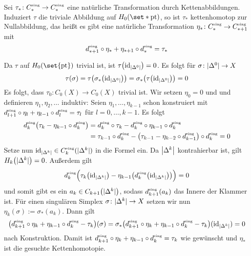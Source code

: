 \begin{proposition}[label=prop:H0_kettenhomotop,{name=[Nullkettenhomotopie von natürlichen Transformationen]}]
	Sei $\tau_* \colon C_*^\sing \to C_*^\sing$ eine natürliche Transformation durch Kettenabbildungen. Induziert $\tau$ die triviale Abbildung auf $H_0(\set*{\pt})$, so ist 
	$\tau_*$ kettenhomotop zur Nullabbildung, das heißt es gibt eine natürliche Transformation $\eta_* \colon C_*^\sing \to C_{*+1}^\sing$ mit 
	\[
		d^\sing_{*+1} \circ \eta_* + \eta_{*+1} \circ d_*^\sing = \tau_* 
	\]
\end{proposition}
\begin{beweis}
	Da $\tau$ auf $H_0(\set{\pt})$ trivial ist, ist $\tau \enbrace*{\id_{\abs*{\Delta^0}}}=0$. Es folgt für $\sigma \colon \abs{\Delta^0} \to X$
	\[
		\tau(\sigma) = \tau \enbrace*{\sigma_* \enbrace*{\id_{\abs*{\Delta^0}}}} = \sigma_* \enbrace*{\tau \enbrace*{\id_{\abs*{\Delta^0}}}} = 0
	\]
	Es folgt, dass $\tau_0 \colon C_0(X) \to C_0(X)$ trivial ist. Wir setzen $\eta_0 = 0$ und und definieren $\eta_1, \eta_2, \ldots $ induktiv: Seien $\eta_1, \ldots,\eta_{k-1}$
	schon konstruiert mit $d^\sing_{l+1} \circ \eta_l + \eta_{l-1} \circ d^\sing_{l}=\tau_l$ für $l=0, \ldots , k-1$. Es folgt
	\begin{align}
		d_k^\sing \enbrace*{\tau_k -  \eta_{k-1} \circ d_k^\sing } &= d^\sing_k \circ \tau_k - d^\sing_k \circ \eta_{k-1} \circ d^\sing_k \\
		&= \tau_{k-1} \circ d_k^\sing -  \enbrace*{\tau_{k-1} - \eta_{k-2} \circ d_{k-1}^\sing} \circ d_k^\sing =0
	\end{align}
	Setze nun $\id_{\abs*{\Delta^k}} \in C_k^\sing( \abs{\Delta^k})$ in die Formel ein. 
	Da $\abs*{\Delta^k}$ kontrahierbar ist, gilt $H_k \enbrace*{\abs{\Delta^k}} =0$. Außerdem gilt
	\[
		d_k^\sing \enbrace[\Big]{\tau_k \enbrace*{\id_{\abs*{\Delta^k} }} - \eta_{k-1} \enbrace*{d_k^\sing \enbrace*{\id_{\abs*{\Delta^k} }}}} =0
	\]
	und somit gibt es ein $a_k \in C_{k+1} \enbrace*{\abs{\Delta^k} }$, sodass $d_{k+1}^\sing(a_k)$ das Innere der Klammer ist. 
	Für einen singulären Simplex $\sigma \colon \abs{\Delta^k} \to X$ setzen wir nun $\eta_k(\sigma) := \sigma_*(a_k)$.
	Dann gilt 
	\[
		\enbrace*{d_{k+1}^\sing \circ \eta_k + \eta_{k-1} \circ d_k^\sing - \tau_k}(\sigma) = \sigma_* \enbrace[\big]{d_{k+1}^\sing \circ \eta_k + \eta_{k-1} \circ d_k^\sing - \tau_k} (\id_{\abs*{\Delta^k}}) =0 
	\]
	nach Konstruktion.
	Damit ist $d_{k+1}^\sing \circ \eta_k + \eta_{k-1} \circ d_k^\sing = \tau_k$ wie gewünscht und $\eta_*$ ist die gesuchte Kettenhomotopie.
\end{beweis}

